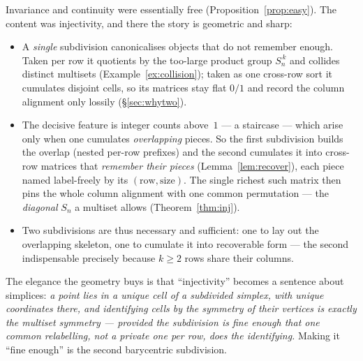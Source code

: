 \documentclass[11pt,a4paper]{article}
\theoremstyle{definition}
\theoremstyle{plain}
\newcommand{\Sn}{S_n}
\begin{document}
Invariance and continuity were essentially free (Proposition~\ref{prop:easy}).
The content was injectivity, and there the story is geometric and sharp:

\begin{itemize}[leftmargin=*]
\item A \emph{single} subdivision canonicalises objects that do not remember
      enough. Taken per row it quotients by the too-large product group
      $\Sn^{\,k}$ and collides distinct multisets (Example~\ref{ex:collision});
      taken as one cross-row sort it cumulates disjoint cells, so its matrices
      stay flat $0/1$ and record the column alignment only lossily
      (\S\ref{sec:whytwo}).
\item The decisive feature is integer counts above~$1$ --- a staircase --- which
      arise only when one cumulates \emph{overlapping} pieces. So the first
      subdivision builds the overlap (nested per-row prefixes) and the second
      cumulates it into cross-row matrices that \emph{remember their pieces}
      (Lemma~\ref{lem:recover}), each piece named label-freely by its
      $(\text{row},\text{size})$. The single richest such matrix then pins the
      whole column alignment with one common permutation --- the \emph{diagonal}
      $\Sn$ a multiset allows (Theorem~\ref{thm:inj}).
\item Two subdivisions are thus necessary and sufficient: one to lay out the
      overlapping skeleton, one to cumulate it into recoverable form --- the
      second indispensable precisely because $k\ge2$ rows share their columns.
\end{itemize}

\noindent
The elegance the geometry buys is that ``injectivity'' becomes a sentence about
simplices: \emph{a point lies in a unique cell of a subdivided simplex, with
unique coordinates there, and identifying cells by the symmetry of their
vertices is exactly the multiset symmetry --- provided the subdivision is fine
enough that one common relabelling, not a private one per row, does the
identifying.} Making it ``fine enough'' is the second barycentric subdivision.
\end{document}
